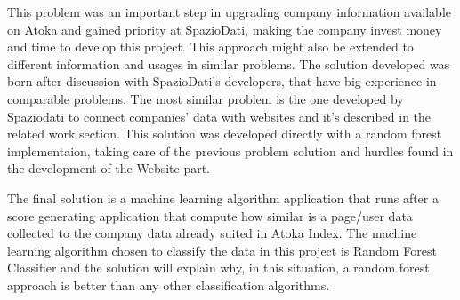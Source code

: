 This problem was an important step in upgrading company information available on Atoka and gained priority at SpazioDati, making the company invest money and time to develop this project. This approach might also be extended to different information and usages in similar problems.
The solution developed was born after discussion with SpazioDati's developers, that have big experience in comparable problems. The most similar problem is the one developed by Spaziodati to connect companies' data with websites and it's described in the related work section. This solution was developed directly with a random forest implementaion, taking care of the previous problem solution and hurdles found in the development of the Website part.

The final solution is a machine learning algorithm application that runs after a score generating application that compute how similar is a page/user data collected to the company data already suited in Atoka Index. The machine learning algorithm chosen to classify the data in this project is Random Forest Classifier and the solution will explain why, in this situation, a random forest approach is better than any other classification algorithms.

